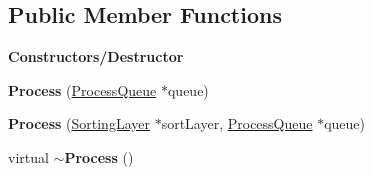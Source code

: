 \subsection*{Public Member Functions}
\begin{Indent}\textbf{ Constructors/\+Destructor}\par
\begin{DoxyCompactItemize}
\item 
\mbox{\label{classrev_1_1_process_a58305ac8622e827e2169f774bbd15c88}} 
{\bfseries Process} (\mbox{\hyperlink{classrev_1_1_process_queue}{Process\+Queue}} $\ast$queue)
\item 
\mbox{\label{classrev_1_1_process_ace369f45953beffdfc6593f3870f7ff9}} 
{\bfseries Process} (\mbox{\hyperlink{structrev_1_1_sorting_layer}{Sorting\+Layer}} $\ast$sort\+Layer, \mbox{\hyperlink{classrev_1_1_process_queue}{Process\+Queue}} $\ast$queue)
\item 
\mbox{\label{classrev_1_1_process_a84782b23e983d16486d683af0bbba0c6}} 
virtual {\bfseries $\sim$\+Process} ()
\end{DoxyCompactItemize}
\end{Indent}
